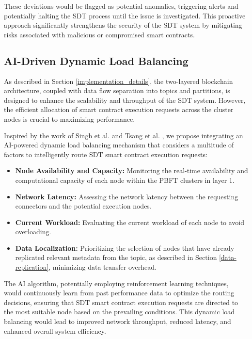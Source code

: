 \documentclass[10pt]{llncs}
\begin{document}
These deviations would be flagged as potential anomalies, triggering alerts and potentially halting the SDT process until the issue is investigated. 
This proactive approach significantly strengthens the security of the SDT system by mitigating risks associated with malicious or compromised smart contracts.

\subsection{AI-Driven Dynamic Load Balancing}

As described in Section \ref{implementation_details}, the two-layered blockchain architecture, coupled with data flow separation into topics and partitions, is designed to enhance the scalability and throughput of the SDT system. 
However, the efficient allocation of smart contract execution requests across the cluster nodes is crucial to maximizing performance.

Inspired by the work of Singh et al. \cite{Singh2024} and Tsang et al. \cite{Tsang2024}, we propose integrating an AI-powered dynamic load balancing mechanism that considers a multitude of factors to intelligently route SDT smart contract execution requests:

\begin{itemize}
    \item \textbf{Node Availability and Capacity:} Monitoring the real-time availability and computational capacity of each node within the PBFT clusters in layer 1.
    \item \textbf{Network Latency:} Assessing the network latency between the requesting connectors and the potential execution nodes.
    \item \textbf{Current Workload:} Evaluating the current workload of each node to avoid overloading.
    \item \textbf{Data Localization:} Prioritizing the selection of nodes that have already replicated relevant metadata from the topic, as described in Section \ref{data-replication}, minimizing data transfer overhead.
   \end{itemize}

The AI algorithm, potentially employing reinforcement learning techniques, would continuously learn from past performance data to optimize the routing decisions, ensuring that SDT smart contract execution requests are directed to the most suitable node based on the prevailing conditions.
 This dynamic load balancing would lead to improved network throughput, reduced latency, and enhanced overall system efficiency.
\end{document}
